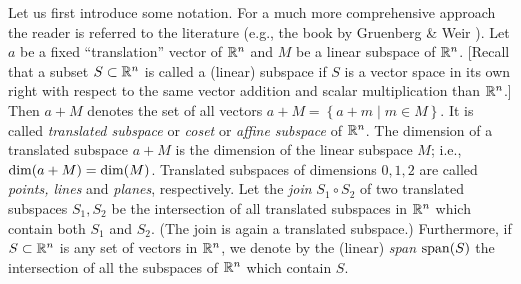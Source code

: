 Let us first introduce some notation.
For a much more comprehensive approach the reader is referred to the literature
(e.g., the book by Gruenberg \& Weir \cite{Gruenberg-77}).
Let $a$ be a fixed ``translation'' vector of ${\Bbb R}^n$
and $M$ be a linear subspace of ${\Bbb R}^n$.
[Recall that a subset $S\subset {\Bbb R}^n$ is called a (linear)
subspace if $S$ is a vector space in its own right with respect to the
same vector addition and scalar multiplication than ${\Bbb R}^n$.]
Then $a+M$ denotes the set of all vectors
$a+M= \left\{ a+m \mid m\in M\right\}$.
It is called  {\em translated subspace} or {\em coset} or {\em affine subspace}
of ${\Bbb R}^n$.
The dimension of a translated subspace $a+M$ is the dimension of the
linear subspace $M$; i.e., ${\rm dim}(a+M)={\rm dim}(M)$.
Translated subspaces of dimensions $0,1,2$ are called
{\em points, lines} and {\em planes}, respectively.
Let the {\em join} $S_1\circ S_2$ of two  translated subspaces
$S_1,S_2$ be the intersection
of all translated subspaces in ${\Bbb R}^n$ which contain both $S_1$ and
$S_2$.
(The join is again a translated subspace.)
Furthermore,
if $S\subset {\Bbb R}^n$ is any set of vectors in ${\Bbb R}^n$, we
denote by the (linear) {\em span} ${\rm span}(S)$
the intersection of all the subspaces of ${\Bbb R}^n$ which contain $S$.


